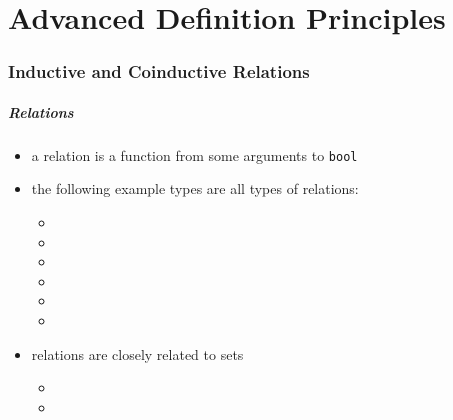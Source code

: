 \part{Advanced Definition Principles}

\frame[plain]{\partpage}

\section{Inductive and Coinductive Relations}

\begin{frame}
\frametitle{Relations}

\begin{itemize}
\item a relation is a function from some arguments to \texttt{bool}
\item the following example types are all types of relations:
\begin{itemize}
\item {}
\item {}
\item {}
\item {}
\item {}
\item {}
\end{itemize}
\item relations are closely related to sets
\begin{itemize}
\item {}
\item {}
\end{itemize}
\end{itemize}
\end{frame}


